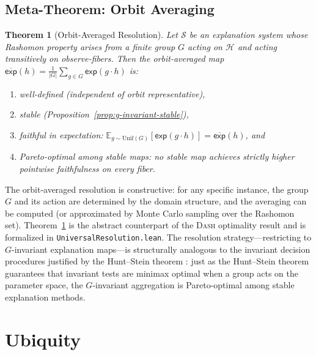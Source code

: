 \documentclass[11pt,a4paper]{article}
\newtheorem{theorem}{Theorem}[section]
\newcommand{\E}{\mathbb{E}}
\newcommand{\DASH}{\textsc{Dash}}
\newcommand{\sH}{\mathcal{H}}
\begin{document}
\subsection{Meta-Theorem: Orbit Averaging}
\label{sec:meta-theorem}

\begin{theorem}[Orbit-Averaged Resolution]
\label{thm:orbit-average}
Let $\mathcal{S}$ be an explanation system whose Rashomon property arises
from a finite group $G$ acting on $\sH$ and acting transitively on
observe-fibers.  Then the orbit-averaged map
$\overline{\mathsf{exp}}(h) = \frac{1}{|G|}\sum_{g \in G}\mathsf{exp}(g \cdot h)$
is:
\begin{enumerate}[label=(\roman*)]
  \item well-defined (independent of orbit representative),
  \item stable (Proposition~\ref{prop:g-invariant-stable}),
  \item faithful in expectation: $\E_{g \sim \mathrm{Unif}(G)}[\mathsf{exp}(g \cdot h)] = \overline{\mathsf{exp}}(h)$, and
  \item Pareto-optimal among stable maps: no stable map achieves strictly
    higher pointwise faithfulness on every fiber.
\end{enumerate}
\end{theorem}

\noindent
The orbit-averaged resolution is constructive: for any specific instance, the
group $G$ and its action are determined by the domain structure, and the
averaging can be computed (or approximated by Monte Carlo sampling over the
Rashomon set).  Theorem~\ref{thm:orbit-average} is the abstract counterpart
of the \DASH{} optimality result and is formalized in
\texttt{UniversalResolution.lean}.
The resolution strategy---restricting to $G$-invariant explanation maps---is
structurally analogous to the invariant decision procedures justified by the
Hunt--Stein theorem \citep{lehmann2005testing}: just as the Hunt--Stein theorem
guarantees that invariant tests are minimax optimal when a group acts on the
parameter space, the $G$-invariant aggregation is Pareto-optimal among stable
explanation methods.

\section{Ubiquity}
\label{sec:ubiquity}
\end{document}
